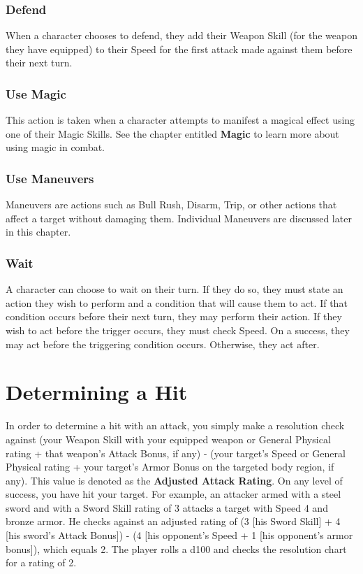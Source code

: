 \documentclass[oneside]{book}
\begin{document}
\begin{multicols}{2}
\subsubsection{Defend}
When a character chooses to defend, they add their Weapon Skill (for the weapon they have equipped) to their Speed for the first attack made against them before their next turn. 

\subsubsection{Use Magic}
This action is taken when a character attempts to manifest a magical effect using one of their Magic Skills. See the chapter entitled \textbf{Magic} to learn more about using magic in combat.

\subsubsection{Use Maneuvers}
Maneuvers are actions such as Bull Rush, Disarm, Trip, or other actions that affect a target without damaging them. Individual Maneuvers are discussed later in this chapter. 

\subsubsection{Wait}
A character can choose to wait on their turn. If they do so, they must state an action they wish to perform and a condition that will cause them to act. If that condition occurs before their next turn, they may perform their action. If they wish to act before the trigger occurs, they must check Speed. On a success, they may act before the triggering condition occurs. Otherwise, they act after.

\section{Determining a Hit}
In order to determine a hit with an attack, you simply make a resolution check against (your Weapon Skill with your equipped weapon or General Physical rating + that weapon's Attack Bonus, if any) - (your target's Speed or General Physical rating + your target's Armor Bonus on the targeted body region, if any). This value is denoted as the \textbf{Adjusted Attack Rating}. On any level of success, you have hit your target. For example, an attacker armed with a steel sword and with a Sword Skill rating of 3 attacks a target with Speed 4 and bronze armor. He checks against an adjusted rating of (3 [his Sword Skill] + 4 [his sword's Attack Bonus]) - (4 [his opponent's Speed + 1 [his opponent's armor bonus]), which equals 2. The player rolls a d100 and checks the resolution chart for a rating of 2.


\end{multicols}
\end{document}
